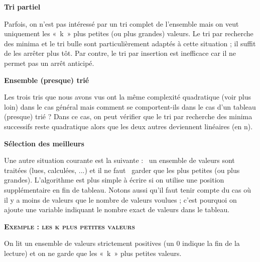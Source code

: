 	{\sffamily\bfseries\upshape
	Tri partiel}

		Parfois, on n’est pas intéressé par un tri complet de l’ensemble mais on
		veut uniquement les «~k~» plus petites (ou plus grandes) valeurs. Le
		tri par recherche des minima et le tri bulle sont particulièrement
		adaptés à cette situation ; il suffit de les arrêter plus tôt. Par
		contre, le tri par insertion est inefficace car il ne permet pas un
		arrêt anticipé.

	{\sffamily\bfseries\upshape
	Ensemble (presque) trié}

		Les trois tris que nous avons vus ont la même complexité quadratique
		(voir plus loin) dans le cas général mais comment se comportent-ils
		dans le cas d’un tableau (presque) trié ? Dans ce cas, on peut vérifier
		que le tri par recherche des minima successifs reste quadratique alors
		que les deux autres deviennent linéaires (en n).

	{\sffamily\bfseries\upshape
	Sélection des meilleurs}

		Une autre situation courante est la suivante : \ un ensemble de valeurs
		sont traitées (lues, calculées, ...) et il ne faut \ garder que les
		 plus petites (ou plus grandes).
		L'algorithme est plus simple à écrire si on utilise
		une position supplémentaire en fin de tableau. Notons aussi qu’il faut
		tenir compte du cas où il y a moins de valeurs que le nombre de valeurs
		voulues ; c’est pourquoi on ajoute une variable indiquant le nombre
		exact de valeurs dans le tableau.

	{\sffamily\bfseries\scshape
	Exemple : les k plus petites valeurs}

		On lit un ensemble de valeurs strictement positives (un 0 indique la fin
		de la lecture) et on ne garde que les «~k~» plus petites valeurs.

		\bigskip
		
		


